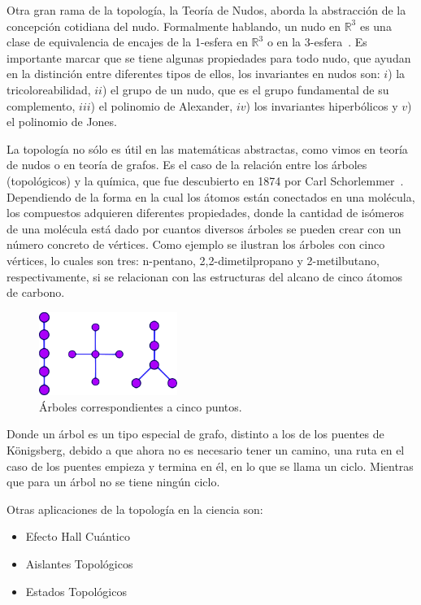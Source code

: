 Otra gran rama de la topología, la Teoría de Nudos, aborda la abstracción de la
concepción cotidiana del nudo. Formalmente hablando, un nudo en $\mathbb{R}^3$
es una clase de equivalencia de encajes de la 1-esfera en $\mathbb{R}^3$ o en
la 3-esfera~\cite{nudos}. Es importante marcar que se tiene algunas propiedades
para todo nudo, que ayudan en la distinción entre diferentes tipos de ellos,
los invariantes en nudos son: $i$) la tricoloreabilidad, $ii$) el grupo de un
nudo, que es el grupo fundamental de su complemento, $iii$) el polinomio de
Alexander, $iv$) los invariantes hiperbólicos y $v$) el polinomio de Jones.

La topología no sólo es útil en las matemáticas abstractas, como vimos en
teoría de nudos o en teoría de grafos. Es el caso de la relación entre los
árboles (topológicos) y la química, que fue descubierto en 1874 por Carl
Schorlemmer~\cite{50cosas}. Dependiendo de la forma en la cual los átomos están
conectados en una molécula, los compuestos adquieren diferentes propiedades,
donde la cantidad de isómeros de una molécula está dado por cuantos diversos
árboles se pueden crear con un número concreto de vértices. Como ejemplo se
ilustran los árboles con cinco vértices, lo cuales son tres: n-pentano,
2,2-dimetilpropano y 2-metilbutano, respectivamente, si se relacionan con las
estructuras del alcano de cinco átomos de carbono.

\begin{figure}
    \centering
    \includegraphics[width=0.4\textwidth]{3/img/arboles}
    \caption{Árboles correspondientes a cinco puntos.}
\label{isomeros_pentano}
\end{figure}

Donde un árbol es un tipo especial de grafo, distinto a los de los puentes de
K\"onigsberg, debido a que ahora no es necesario tener un camino, una ruta en
el caso de los puentes empieza y termina en él, en lo que se llama un ciclo.
Mientras que para un árbol no se tiene ningún ciclo.

Otras aplicaciones de la topología en la ciencia son:
\begin{itemize}
\item Efecto Hall Cuántico
\item Aislantes Topológicos
\item Estados Topológicos
\end{itemize}


